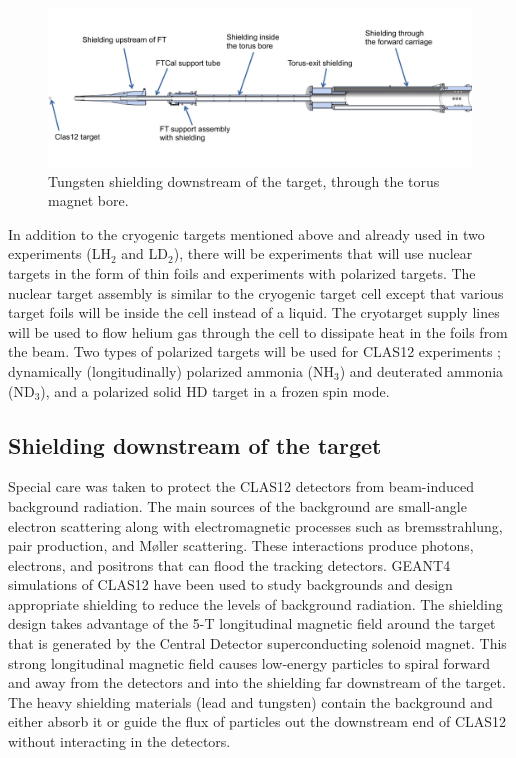 \begin{figure}[t]
\begin{center}
\includegraphics[width=1.\textwidth]{beamline_hall_shielding.pdf}
\caption{Tungsten shielding downstream of the target, through the torus magnet bore.}
\label{fig:shield}
\end{center}
\end{figure}


In addition to the cryogenic targets mentioned above and already used in two experiments (LH$_2$ and LD$_2$), there will be experiments
that will use nuclear targets in the form of thin foils and experiments with polarized targets. The nuclear target assembly is similar to the 
cryogenic target cell except that various target foils will be inside the cell instead of a liquid. The cryotarget supply lines will be used to flow 
helium gas through the cell to dissipate heat in the foils from the beam. Two types of polarized targets will be used for CLAS12 experiments
\cite{Keith:2015ete}; dynamically (longitudinally) polarized ammonia (NH$_3$) and deuterated ammonia (ND$_3$), and a polarized solid 
HD target in a frozen spin mode. 

\subsection{Shielding downstream of the target} 

Special care was taken to protect the CLAS12 detectors from beam-induced background radiation. The main sources of the background are 
small-angle electron scattering along with electromagnetic processes such as bremsstrahlung, pair production, and M{\o}ller scattering. 
These interactions produce photons, electrons, and positrons that can flood the tracking detectors. GEANT4 simulations of CLAS12
have been used to study backgrounds and design appropriate shielding to reduce the levels of background radiation.  The shielding design
takes advantage of the 5-T longitudinal magnetic field around the target that is generated by the Central Detector superconducting solenoid 
magnet. This strong longitudinal magnetic field causes low-energy particles to spiral forward and away from the detectors and into the 
shielding far downstream of the target. The heavy shielding materials (lead and tungsten) contain the background and either absorb it or 
guide the flux of particles out the downstream end of CLAS12 without interacting in the detectors. 

